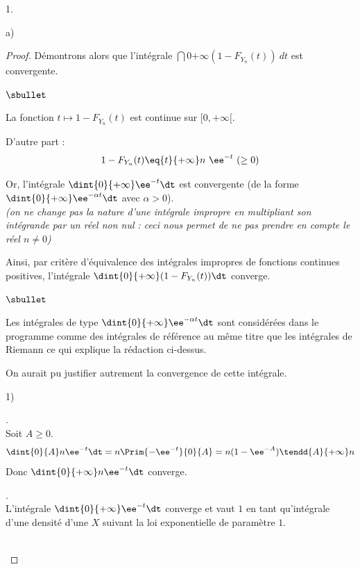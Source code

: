 \begin{noliste}{1.}
\begin{noliste}{a)}
\begin{proof}
      \noindent Démontrons alors que l'intégrale $\dint{0}{+ \infty}
      \left(1-F_{Y_{n}}(t) \right) \ dt$ est convergente.
      \begin{noliste}{$\sbullet$}       
      \item La fonction $t\mapsto 1-F_{Y_n}(t)$ est continue sur
        $[0,+\infty[$.
      \item D'autre part :
        \[
        1-F_{Y_n}(t) \eq{t}{+\infty} n\ \ee^{-t} \ (\geq 0)
        \]
      \item Or, l'intégrale $\dint{0}{+\infty} \ee^{-t} \dt$ est
        convergente (de la forme $\dint{0}{+\infty} \ee^{- \alpha t}
        \dt$ avec $\alpha > 0$).\\
        {\it (on ne change pas la nature d'une intégrale impropre en
          multipliant son intégrande par un réel non nul : ceci nous
          permet de ne pas prendre en compte le réel $n \neq 0$)}
      \end{noliste}
      Ainsi, par critère d'équivalence des intégrales impropres de
      fonctions continues positives, l'intégrale $\dint{0}{+\infty}
      (1-F_{Y_n}(t))\dt$ converge.%
      ~\\[-.8cm]
      \begin{remark}%
        \begin{noliste}{$\sbullet$}
        \item Les intégrales de type $\dint{0}{+\infty} \ee^{- \alpha
            t} \dt$ sont considérées dans le programme comme des
          intégrales de référence au même titre que les intégrales de
          Riemann ce qui explique la rédaction ci-dessus.
        \item On aurait pu justifier autrement la convergence de cette
          intégrale.
          \begin{noliste}{1)}
          \item {}.\\
            Soit $A\geq 0$.
            \[
            \dint{0}{A} n\ee^{-t}\dt = n\Prim{-\ee^{-t}}{0}{A}=
            n(1-\ee^{-A}) \tendd{A}{+\infty} n
            \]
            Donc $\dint{0}{+\infty} n\ee^{-t} \dt$ converge.

          \item {}.\\
            L'intégrale $\dint{0}{+\infty} \ee^{- t} \dt$ converge et
            vaut $1$ en tant qu'intégrale d'une densité d'une \var $X$
            suivant la loi exponentielle de paramètre $1$.
          \end{noliste}
        \end{noliste}
      \end{remark}~\\[-1.4cm]
    \end{proof}
      

\end{noliste}
\end{noliste}
